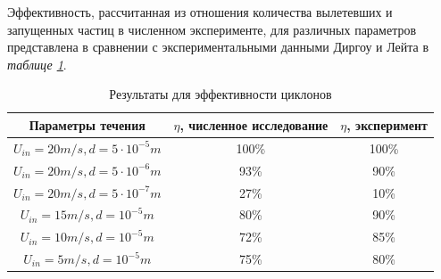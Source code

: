 Эффективность, рассчитанная из отношения количества вылетевших и запущенных частиц в численном эксперименте, для различных параметров представлена в сравнении с экспериментальными данными Диргоу и Лейта \cite{DirgoLeith} в \textit{таблице \ref{tableSolution}}.

\begin{center}
	\begin{table}[h]
		\vspace{-1em}
		\caption{Результаты для эффективности циклонов}
		\label{tableSolution}
		\begin{tabular}{|c|c|c|}
			\hline
			Параметры течения & $\eta$, численное исследование & $\eta$, эксперимент \\
			\hline
			$U_{in}=20m/s, d=5 \cdot 10^{-5}m$ & 100\% & 100\% \\
			\hline
			$U_{in}=20m/s, d=5 \cdot 10^{-6}m$ & 93\% & 90\%\\
			\hline
			$U_{in}=20m/s, d=5 \cdot 10^{-7}m$ & 27\% & 10\%\\
			\hline
			$U_{in}=15m/s, d=10^{-5}m$ & 80\% & 90\% \\
			\hline
			$U_{in}=10m/s, d=10^{-5}m$ & 72\% & 85\% \\
			\hline
			$U_{in}=5m/s, d=10^{-5}m$ & 75\% & 80\% \\
			\hline
		\end{tabular}
	\end{table}
\end{center}
\clearpage
